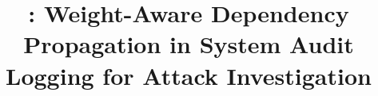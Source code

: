 \documentclass[letterpaper,twocolumn,10pt]{article}
\begin{document}
\title{\Large \bf \tool: Weight-Aware Dependency Propagation in System Audit Logging for Attack Investigation}




\maketitle















\end{document}
